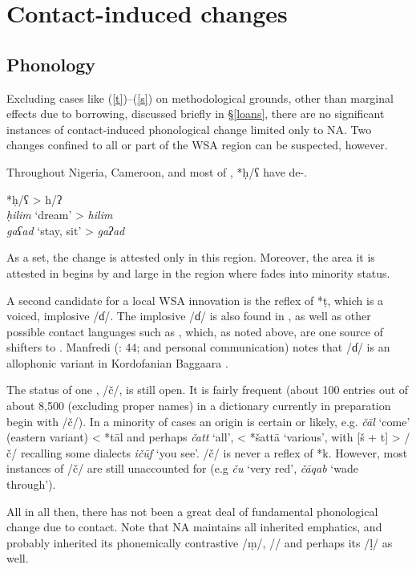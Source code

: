 \documentclass[output=paper]{langsci/langscibook}
\begin{document}
\section{Contact-induced changes
}

\subsection{Phonology}
\label{phon}

Excluding cases like (\ref{t})–(\ref{s}) on methodological grounds, other than marginal effects due to borrowing, discussed briefly in §\ref{loans}, there are no significant instances of contact-induced phonological change limited only to NA. Two changes confined to all or part of the WSA region can be suspected, however.

Throughout Nigeria, Cameroon, and most of  , *ḥ/ʕ have de-.

\ea
*\textup{ḥ/ʕ} > h/ʔ\\
         \textit{ḥilim} ‘dream’ > \textit{hilim}\\
        \textit{gaʕad} ‘stay, sit’ > \textit{gaʔad}
\z

As a set, the change is attested only in this region. Moreover, the area it is attested in begins by and large in the region where  fades into minority status.


A second candidate for a local WSA innovation is the reflex of *ṭ, which is a voiced,  implosive /ɗ/. The implosive /ɗ/ is also found in , as well as other possible contact languages such as , which, as noted above, are one source of shifters to . Manfredi (\citeyear{Manfredi2010}: 44; and personal communication) notes that /ɗ/ is an allophonic variant in Kordofanian Baggaara .

The status of one , /č/, is still open. It is fairly frequent (about 100 entries out of about 8,500 (excluding proper names) in a dictionary currently in preparation begin with /č/). In a minority of cases an  origin is certain or likely, e.g. \textit{čāl} ‘come’ (eastern variant) < *tāl and perhaps \textit{čatt} ‘all’, < *šattā ‘various’, with [š + t] > /č/ recalling some  dialects \textit{ičūf} ‘you see’. /č/ is never a reflex of *k. However, most instances of /č/ are still unaccounted for (e.g \textit{ču} ‘very red’, \textit{čāqab} ‘wade through’).

All in all then, there has not been a great deal of fundamental phonological change due to contact. Note that NA maintains all inherited emphatics, and probably inherited its phonemically contrastive  /ṃ/, /{\R}/ and perhaps its /ḷ/ as well.
\end{document}
